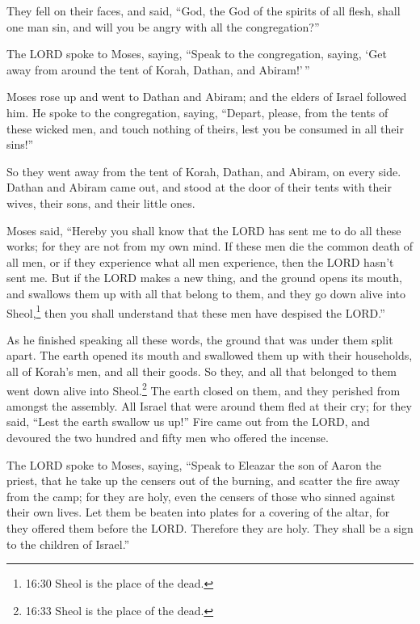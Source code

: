  They fell on their faces, and said, ``God, the God of the
spirits of all flesh, shall one man sin, and will you be angry with all
the congregation?''

 The LORD spoke to Moses, saying,  ``Speak to
the congregation, saying, `Get away from around the tent of Korah,
Dathan, and Abiram!'\,''

 Moses rose up and went to Dathan and Abiram; and the
elders of Israel followed him.  He spoke to the
congregation, saying, ``Depart, please, from the tents of these wicked
men, and touch nothing of theirs, lest you be consumed in all their
sins!''

 So they went away from the tent of Korah, Dathan, and
Abiram, on every side. Dathan and Abiram came out, and stood at the door
of their tents with their wives, their sons, and their little ones.

 Moses said, ``Hereby you shall know that the LORD has sent
me to do all these works; for they are not from my own mind.
 If these men die the common death of all men, or if they
experience what all men experience, then the LORD hasn't sent me.
 But if the LORD makes a new thing, and the ground opens
its mouth, and swallows them up with all that belong to them, and they
go down alive into Sheol,\footnote{16:30 Sheol is the place of the dead.}
then you shall understand that these men have despised the LORD.''

 As he finished speaking all these words, the ground that
was under them split apart.  The earth opened its mouth and
swallowed them up with their households, all of Korah's men, and all
their goods.  So they, and all that belonged to them went
down alive into Sheol.\footnote{16:33 Sheol is the place of the dead.}
The earth closed on them, and they perished from amongst the assembly.
 All Israel that were around them fled at their cry; for
they said, ``Lest the earth swallow us up!''  Fire came out
from the LORD, and devoured the two hundred and fifty men who offered
the incense.

 The LORD spoke to Moses, saying,  ``Speak to
Eleazar the son of Aaron the priest, that he take up the censers out of
the burning, and scatter the fire away from the camp; for they are holy,
 even the censers of those who sinned against their own
lives. Let them be beaten into plates for a covering of the altar, for
they offered them before the LORD. Therefore they are holy. They shall
be a sign to the children of Israel.''

